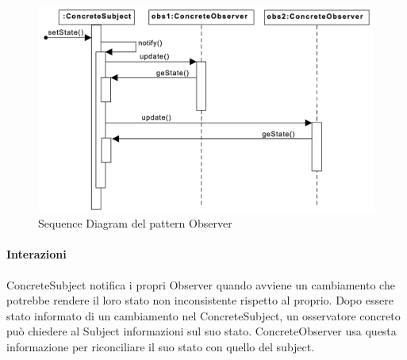 \begin{figure}[H]
    \centering
    \includegraphics[width=1\linewidth]{assets/pattern/observer/observer-sequence.png}
    \caption{Sequence Diagram del pattern Observer}
\end{figure}

\paragraph{Interazioni} ConcreteSubject notifica i propri Observer quando avviene un cambiamento che potrebbe rendere il loro stato non inconsistente rispetto al proprio. Dopo essere stato informato di un cambiamento nel ConcreteSubject, un osservatore concreto può chiedere al Subject informazioni sul suo stato. ConcreteObserver usa questa informazione per riconciliare il suo stato con quello del subject.

\newpage